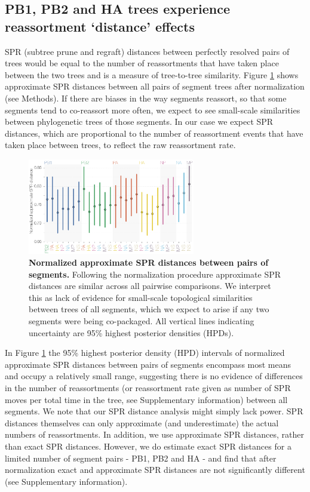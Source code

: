 \documentclass[11pt,oneside,letterpaper]{article}
\begin{document}
\subsection*{PB1, PB2 and HA trees experience reassortment `distance' effects}
SPR (subtree prune and regraft) distances between perfectly resolved pairs of trees would be equal to the number of reassortments that have taken place between the two trees and is a measure of tree-to-tree similarity.
Figure \ref{SPRdistances} shows approximate SPR distances between all pairs of segment trees after normalization (see Methods).
If there are biases in the way segments reassort, so that some segments tend to co-reassort more often, we expect to see small-scale similarities between phylogenetic trees of those segments.
In our case we expect SPR distances, which are proportional to the number of reassortment events that have taken place between trees, to reflect the raw reassortment rate.

\begin{figure}[h]
	\centering		
	\includegraphics[width=0.65\textwidth]{figures/InfB_normalizedApproxSPR.png}
	\caption{\textbf{Normalized approximate SPR distances between pairs of segments.}
Following the normalization procedure approximate SPR distances are similar across all pairwise comparisons.
We interpret this as lack of evidence for small-scale topological similarities between trees of all segments, which we expect to arise if any two segments were being co-packaged.
All vertical lines indicating uncertainty are 95\% highest posterior densities (HPDs).}
	\label{SPRdistances}
\end{figure}

In Figure \ref{SPRdistances} the 95\% highest posterior density (HPD) intervals of normalized approximate SPR distances between pairs of segments encompass most means and occupy a relatively small range, suggesting there is no evidence of differences in the number of reassortments (or reassortment rate given as number of SPR moves per total time in the tree, see Supplementary information) between all segments.
We note that our SPR distance analysis might simply lack power.
SPR distances themselves can only approximate (and underestimate) the actual numbers of reassortments.
In addition, we use approximate SPR distances, rather than exact SPR distances.
However, we do estimate exact SPR distances for a limited number of segment pairs - PB1, PB2 and HA - and find that after normalization exact and approximate SPR distances are not significantly different (see Supplementary information). 
\end{document}
